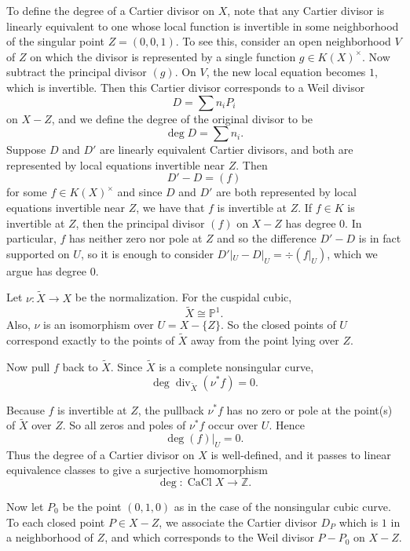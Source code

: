 \documentclass[12pt]{article}
\begin{document}
\begin{example}
    To define the degree of a Cartier divisor on $X$, note that any Cartier divisor is linearly equivalent to one whose local function is invertible in some neighborhood of the singular point $Z=(0,0,1)$. To see this, consider an open neighborhood $V$ of $Z$ on which the divisor is represented by a single function $g\in K(X)^\times$. Now subtract the principal divisor $(g)$. On $V$, the new local equation becomes $1$, which is invertible.
    Then this Cartier divisor corresponds to a Weil divisor
    \[
        D = \sum n_i P_i
    \]
    on $X - Z$, and we define the degree of the original divisor to be
    \[
        \deg D = \sum n_i.
    \]
    Suppose $D$ and $D'$ are linearly equivalent Cartier divisors, and both are represented by local equations invertible near $Z$. Then
    \[
        D' - D = (f)
    \]
    for some $f \in K(X)^\times$ and since $D$ and $D'$ are both represented by local equations invertible near $Z$, we have that $f$ is invertible at $Z$. If $f \in K$ is invertible at $Z$, then the principal divisor $(f)$ on $X - Z$ has degree $0$. In particular, $f$ has neither zero nor pole at $Z$ and so the difference $D' - D$ is in fact supported on $U$, so it is enough to consider $D'|_U - D|_U = \div(f|_U)$, which we argue has degree $0$.

    Let $\nu : \widetilde{X} \to X$ be the normalization. For the cuspidal cubic,
    \[
        \widetilde{X} \cong \mathbb{P}^1.
    \]
    Also, $\nu$ is an isomorphism over $U = X - \{Z\}$. So the closed points of $U$ correspond exactly to the points of $\widetilde{X}$ away from the point lying over $Z$.

    Now pull $f$ back to $\widetilde{X}$. Since $\widetilde{X}$ is a complete nonsingular curve,
    \[
        \deg \operatorname{div}_{\widetilde{X}}(\nu^*f) = 0.
    \]

    Because $f$ is invertible at $Z$, the pullback $\nu^*f$ has no zero or pole at the point(s) of $\widetilde{X}$ over $Z$. So all zeros and poles of $\nu^*f$ occur over $U$. Hence
    \[
        \deg (f)|_U = 0.
    \]
    Thus the degree of a Cartier divisor on $X$ is well-defined, and it passes to linear equivalence classes to give a surjective homomorphism
    \[
        \deg : \operatorname{CaCl} X \to \mathbb{Z}.
    \]

    Now let $P_0$ be the point $(0,1,0)$ as in the case of the nonsingular cubic curve. To each closed point $P \in X - Z$, we associate the Cartier divisor $D_P$ which is $1$ in a neighborhood of $Z$, and which corresponds to the Weil divisor $P - P_0$ on $X - Z$.


\end{example}
\end{document}
